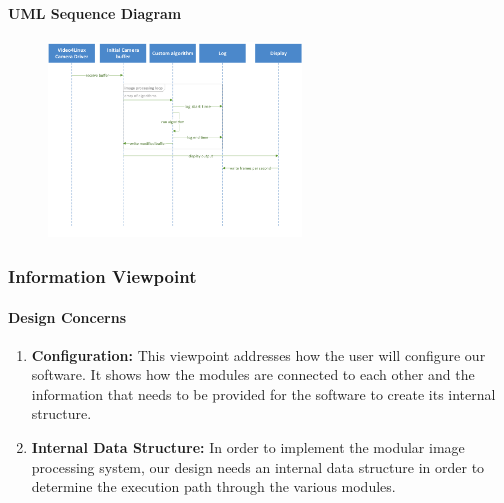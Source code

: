 	\paragraph{UML Sequence Diagram}
	\begin{figure}[!ht] %
		\centering
		\includegraphics[width=0.6\textwidth,natwidth=610,natheight=642]{images/UML_Diagram.png}  
		\end{figure}
	
\subsubsection{Information Viewpoint}
	\paragraph{Design Concerns}
	
	\begin{enumerate}[leftmargin=2cm,labelindent=2cm]
	\item \textbf{Configuration:}
	This viewpoint addresses how the user will configure our software. It shows how the modules are connected to each other and the information that 	needs to be provided for the software to create its internal structure.

	\item \textbf{Internal Data Structure:}
	In order to implement the modular image processing system, our design needs an internal data structure in order to determine the execution path 	through the various modules.\\
	\end{enumerate}
	
